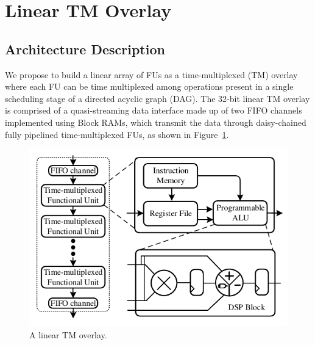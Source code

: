 \section{Linear TM Overlay}

\subsection{Architecture Description}
We propose to build a linear array of FUs as a time-multiplexed (TM) overlay~\cite{li2018time} where each FU can be time multiplexed among operations present in a single scheduling stage of a directed acyclic graph (DAG). 
The 32-bit linear TM overlay is comprised of a quasi-streaming data interface made up of two FIFO channels implemented using Block RAMs, which transmit the data through daisy-chained fully pipelined time-multiplexed FUs, as shown in Figure~\ref{overlay}. 

\begin{figure}
    \centering
	\includegraphics[width=\columnwidth]{Figures/overlay.pdf}
	\caption{A linear TM overlay.}
	\label{overlay}
\end{figure}

